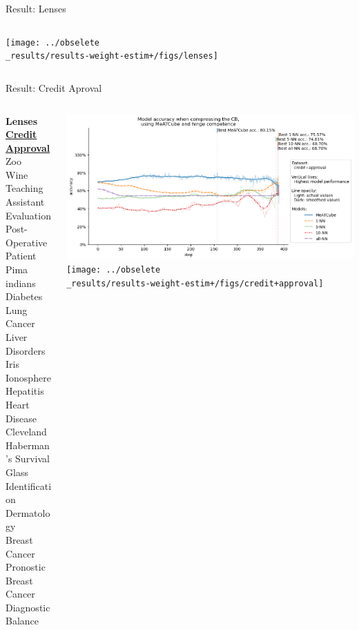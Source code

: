 \documentclass[]{beamer}
\begin{document}
\begin{frame}{Result: Lenses}
\begin{columns}
\begin{column}{.7\textwidth}
            \texttt{[image: ../obselete\\\_results/results-weight-estim+/figs/lenses]}
        \end{column}
    \end{columns}
\end{frame}
\begin{frame}{Result: Credit Aproval}
    \begin{columns}
        \begin{column}{.3\textwidth}
            {\smaller\smaller\smaller
            \textbf{Lenses} \\
            \underline{\textbf{Credit Approval}} \\
            Zoo \\
            Wine \\
            Teaching Assistant Evaluation \\
            Post-Operative Patient \\
            Pima indians Diabetes \\
            Lung Cancer \\
            Liver Disorders \\
            Iris \\
            Ionosphere \\
            Hepatitis \\
            Heart Disease Cleveland \\
            Haberman's Survival \\
            Glass Identification \\
            Dermatology \\
            Breast Cancer Pronostic \\
            Breast Cancer Diagnostic \\
            Balance\\
            ~}
        \end{column}
        \begin{column}{.7\textwidth}
            \includegraphics[width=\textwidth]{../results-no-sim-tuning+/figs/credit+approval}
            \texttt{[image: ../obselete\\\_results/results-weight-estim+/figs/credit+approval]}
        \end{column}
    \end{columns}
\end{frame}
\end{document}
